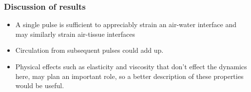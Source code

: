 % 
% 
\begin{frame}\frametitle{Discussion of results}
  \begin{itemize}
  \item A single pulse is sufficient to appreciably strain an air-water interface and may similarly strain air-tissue interfaces
  \item Circulation from subsequent pulses could add up.
  \item Physical effects such as elasticity and viscosity that don't
    effect the dynamics here, may plan an important role, so a better
    description of these properties would be useful.
  \end{itemize}
\end{frame}
% 
% 
